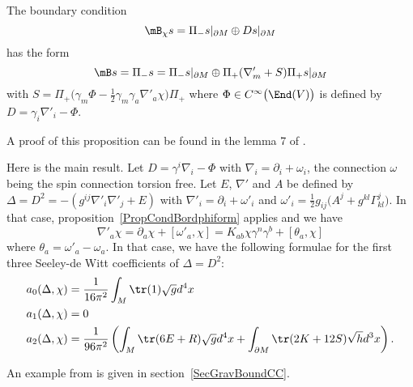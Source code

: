 \begin{proposition}		\label{PropCondBordphiform}
The boundary condition
\[
  \mB_{\chi}s=\Pi_-s|_{\partial M}\oplus Ds|_{\partial M}
\]
has the form
\[
  \mB s=\Pi_-s=\Pi_-s|_{\partial M}\oplus\Pi_+(\nabla'_m+S)\Pi_+s|_{\partial M}
\]
with $S=\Pi_+\big( \gamma_m\Phi-\frac{ 1 }{2}\gamma_m\gamma_a\nabla'_a\chi \big)\Pi_+$ where $\Phi\in C^{\infty}\big( \End(V) \big)$ is defined by $D=\gamma_i\nabla'_i-\Phi$.
\end{proposition}
A proof of this proposition can be found in the lemma 7 of \cite{ResEtaDiracTypeBoundary}.

Here is the main result. Let $D=\gamma^i\nabla_i-\Phi$ with $\nabla_i=\partial_i+\omega_i$, the connection $\omega$ being the spin connection torsion free. Let $E$, $\nabla'$ and $A$ be defined by $\Delta=D^2=-(g^{ij}\nabla'_i\nabla'_j+E)$ with $\nabla'_i=\partial_i+\omega'_i$ and $\omega'_i=\frac{ 1 }{2}g_{ij}\big( A^j+g^{kl}\Gamma^j_{kl} \big)$. In that case, proposition~\ref{PropCondBordphiform} applies and we have
\[
  \nabla'_a\chi=\partial_a\chi+[\omega'_a,\chi]=K_{ab}\chi\gamma^n\gamma^b+[\theta_a,\chi]
\]
where $\theta_a=\omega'_a-\omega_a$. In that case, we have the following formulae for the first three Seeley-de Witt coefficients of $\Delta=D^2$:
\begin{equation}		\label{EqSeeyleydeWitt}
\begin{split}
a_0(\Delta,\chi)	&=\frac{1}{ 16\pi^2 }\int_M\tr(1)\sqrt{g}d^4x\\
a_1(\Delta,\chi)	&=0\\
a_2(\Delta,\chi)	&=\frac{1}{ 96\pi^2 }\left( \int_M \tr(6E+R)\sqrt{g}d^4x+\int_{\partial M}\tr(2K+12S)\sqrt{h}d^3x   \right).
\end{split}
\end{equation}

An example from \cite{QGBoundaryTermsSpectralAction} is given in section~\ref{SecGravBoundCC}.
